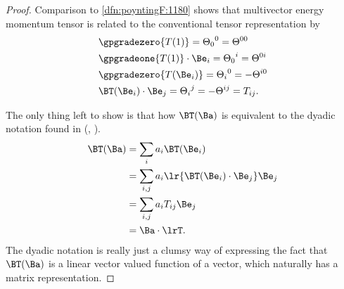 \begin{proof}
Comparison to \cref{dfn:poyntingF:1180} shows that multivector energy momentum tensor is related to the conventional tensor representation by
\begin{equation}\label{eqn:poyntingF:820}
\begin{aligned}
&\gpgradezero{ T(1) }
=
{\Theta_0}^0 = \Theta^{00} \\
&\gpgradeone{ T(1) } \cdot \Be_i
= {\Theta_0}^i = \Theta^{0i} \\
&\gpgradezero{ T(\Be_i) }
= {\Theta_i}^0 = -\Theta^{i0} \\
&\BT(\Be_i) \cdot \Be_j = {\Theta_i}^j = -\Theta^{ij} = T_{ij}.
\end{aligned}
\end{equation}

The only thing left to show is that how \( \BT(\Ba) \) is equivalent to the dyadic notation found in
(\citep{griffiths1999introduction}, \citep{jackson1975cew}).
\begin{equation}\label{eqn:poyntingF:1140}
\begin{aligned}
\BT(\Ba)
&= \sum_i a_i \BT(\Be_i) \\
&= \sum_{i,j} a_i \lr{ \BT(\Be_i) \cdot \Be_j } \Be_j \\
&= \sum_{i,j} a_i T_{ij} \Be_j \\
&= \Ba \cdot \lrT.
\end{aligned}
\end{equation}
The dyadic notation is really just a clumsy way of expressing the fact that \( \BT(\Ba) \) is a linear vector valued function of a vector, which naturally
has a matrix representation.
\end{proof}


